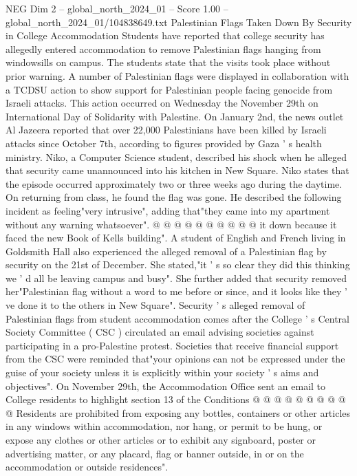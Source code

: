 \begin{textsample}{NEG Dim 2 – global\_north\_2024\_01 – Score 1.00 – global\_north\_2024\_01/104838649.txt}  \label{ex:f2_neg_342}
Palestinian Flags Taken Down By Security in College Accommodation Students have reported that college security has allegedly entered accommodation to remove Palestinian flags hanging from windowsills on campus.
The students state that the visits took place without prior warning.
A number of Palestinian flags were displayed in collaboration with a TCDSU action to show support for Palestinian people facing genocide from Israeli attacks.
This action occurred on Wednesday the November 29th on International Day of Solidarity with Palestine.
On January 2nd, the news outlet Al Jazeera reported that over 22,000 Palestinians have been killed by Israeli attacks since October 7th, according to figures provided by Gaza ' s health ministry.
Niko, a Computer Science student, described his shock when he alleged that security came unannounced into his kitchen in New Square.
Niko states that the episode occurred approximately two or three weeks ago during the daytime.
On returning from class, he found the flag was gone.
He described the following incident as feeling"very intrusive", adding that"they came into my apartment without any warning whatsoever". @ @ @ @ @ @ @ @ @ @ it down because it faced the new Book of Kells building".
A student of English and French living in Goldsmith Hall also experienced the alleged removal of a Palestinian flag by security on the 21st of December.
She stated,"it ' s so clear they did this thinking we ' d all be leaving campus and busy".
She further added that security removed her"Palestinian flag without a word to me before or since, and it looks like they ' ve done it to the others in New Square".
Security ' s alleged removal of Palestinian flags from student accommodation comes after the College ' s Central Society Committee ( CSC ) circulated an email advising societies against participating in a pro-Palestine protest.
Societies that receive financial support from the CSC were reminded that"your opinions can not be expressed under the guise of your society unless it is explicitly within your society ' s aims and objectives".
On November 29th, the Accommodation Office sent an email to College residents to highlight section 13 of the Conditions @ @ @ @ @ @ @ @ @ @ Residents are prohibited from exposing any bottles, containers or other articles in any windows within accommodation, nor hang, or permit to be hung, or expose any clothes or other articles or to exhibit any signboard, poster or advertising matter, or any placard, flag or banner outside, in or on the accommodation or outside residences".

\end{textsample}
